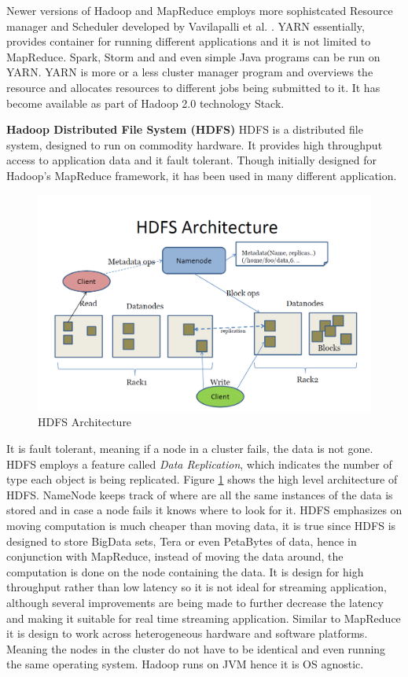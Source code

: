 \documentclass[english]{tktltiki}
\begin{document}
Newer versions of Hadoop and MapReduce employs more sophistcated Resource manager and Scheduler developed by Vavilapalli et al. \cite{vavila13}. YARN essentially, provides container for running different applications and it is not limited to MapReduce. Spark, Storm and and even simple Java programs can be run on YARN. YARN is more or a less cluster manager program and overviews the resource and allocates resources to different jobs being submitted to it. It has become available as part of Hadoop 2.0 technology Stack.



\textbf{Hadoop Distributed File System (HDFS)}
HDFS is a distributed file system, designed to run on commodity hardware. It provides high throughput access to application data and it fault tolerant. Though initially designed for Hadoop's MapReduce framework, it has been used in many different application.
\begin{figure}[ht!]
\centering
\includegraphics[width=130mm]{figures/hdfsarchitecture.png}
\caption{HDFS Architecture}
\label{fig:hdfsarch}
\end{figure}

It is fault tolerant, meaning if a node in a cluster fails, the data is not gone. HDFS employs a feature called \textit{Data Replication}, which indicates the number of type each object is being replicated. Figure \ref{fig:hdfsarch} shows the high level architecture of HDFS. NameNode keeps track of where are all the same instances of the data is stored and in case a node fails it knows where to look for it. HDFS emphasizes on moving computation is much cheaper than moving data, it is true since HDFS is designed to store BigData sets, Tera or even PetaBytes of data, hence in conjunction with MapReduce, instead of moving the data around, the computation is done on the node containing the data. It is design for high throughput  rather than low latency so it is not ideal for streaming application, although several improvements are being made to further decrease the latency and making it suitable for real time streaming application. Similar to MapReduce it is design to work across heterogeneous hardware and software platforms. Meaning the nodes in the cluster do not have to be identical and even running the same operating system. Hadoop runs on JVM hence it is OS agnostic. 
\end{document}
